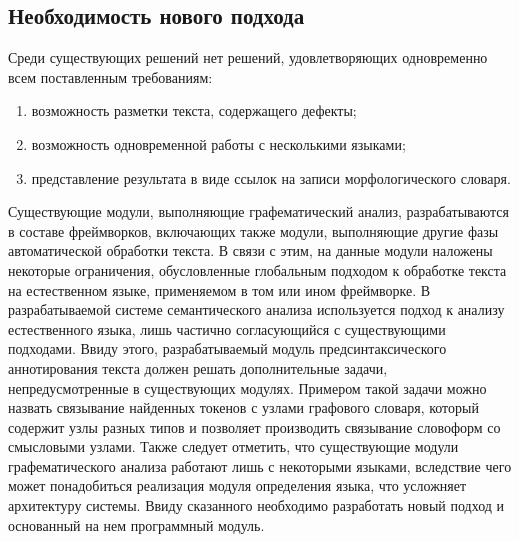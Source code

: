 \subsection{Необходимость нового подхода}
Среди существующих решений нет решений, удовлетворяющих одновременно всем поставленным требованиям:
\begin{enumerate}
	\item 
	возможность разметки текста, содержащего дефекты;
	\item
	возможность одновременной работы с несколькими языками;
	\item
	представление результата в виде ссылок на записи морфологического словаря.
\end{enumerate}
Существующие модули, выполняющие графематический анализ, разрабатываются в составе фреймворков, включающих также модули, выполняющие другие фазы автоматической обработки текста. В связи с этим, на данные модули наложены некоторые ограничения, обусловленные глобальным подходом к обработке текста на естественном языке, применяемом в том или ином фреймворке. В разрабатываемой системе семантического анализа используется подход к анализу естественного языка, лишь частично согласующийся с существующими подходами. Ввиду этого, разрабатываемый модуль предсинтаксического аннотирования текста должен решать дополнительные задачи, непредусмотренные в существующих модулях. Примером такой задачи можно назвать связывание найденных токенов с узлами графового словаря, который содержит узлы разных типов и позволяет производить связывание словоформ со смысловыми узлами. Также следует отметить, что существующие модули графематического анализа работают лишь с некоторыми языками, вследствие чего может понадобиться реализация модуля определения языка, что усложняет архитектуру системы. Ввиду сказанного необходимо разработать новый подход и основанный на нем программный модуль.